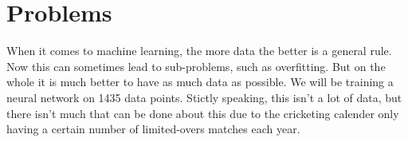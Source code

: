 \section{Problems}
When it comes to machine learning, the more data the better is a general rule. Now this can sometimes lead to sub-problems, such as overfitting. But on the whole 
it is much better to have as much data as possible. We will be training a neural network on 1435 data points. Stictly speaking, this isn't a lot of data, but there
isn't much that can be done about this due to the cricketing calender only having a certain number of limited-overs matches each year.
